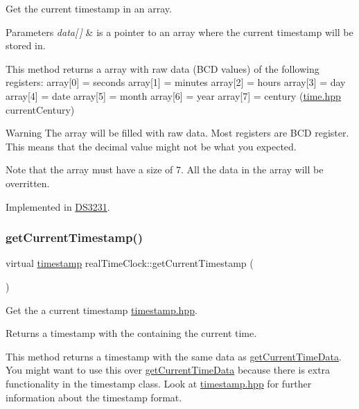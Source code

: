 Get the current timestamp in an array. 


\begin{DoxyParams}{Parameters}
{\em data\mbox{[}$\,$\mbox{]}} & is a pointer to an array where the current timestamp will be stored in.\\
\hline
\end{DoxyParams}
This method returns a array with raw data (B\+CD values) of the following registers\+: array\mbox{[}0\mbox{]} = seconds array\mbox{[}1\mbox{]} = minutes array\mbox{[}2\mbox{]} = hours array\mbox{[}3\mbox{]} = day array\mbox{[}4\mbox{]} = date array\mbox{[}5\mbox{]} = month array\mbox{[}6\mbox{]} = year array\mbox{[}7\mbox{]} = century (\mbox{\hyperlink{time_8hpp_source}{time.\+hpp}} current\+Century) \begin{DoxyWarning}{Warning}
The array will be filled with raw data. Most registers are B\+CD register. This means that the decimal value might not be what you expected. 

Note that the array must have a size of 7. All the data in the array will be overritten. 
\end{DoxyWarning}


Implemented in \mbox{\hyperlink{class_d_s3231_a0ca41c2242367c5ff1424d1b12f909c5}{D\+S3231}}.

\mbox{\label{classreal_time_clock_a08a7854ef9cef638996a267a953c9b14}} 
\subsubsection{\texorpdfstring{get\+Current\+Timestamp()}{getCurrentTimestamp()}\hspace{0.1cm}{\footnotesize\ttfamily [1/2]}}
{\footnotesize\ttfamily virtual \mbox{\hyperlink{classtimestamp}{timestamp}} real\+Time\+Clock\+::get\+Current\+Timestamp (\begin{DoxyParamCaption}{ }\end{DoxyParamCaption})\hspace{0.3cm}{\ttfamily [pure virtual]}}



Get the a current timestamp \mbox{\hyperlink{timestamp_8hpp_source}{timestamp.\+hpp}}. 

\begin{DoxyReturn}{Returns}
a timestamp with the containing the current time.
\end{DoxyReturn}
This method returns a timestamp with the same data as \mbox{\hyperlink{classreal_time_clock_a2d1613b3cd572f62bc9faaea6a0f82f2}{get\+Current\+Time\+Data}}. You might want to use this over \mbox{\hyperlink{classreal_time_clock_a2d1613b3cd572f62bc9faaea6a0f82f2}{get\+Current\+Time\+Data}} because there is extra functionality in the timestamp class. Look at \mbox{\hyperlink{timestamp_8hpp_source}{timestamp.\+hpp}} for further information about the timestamp format. 

